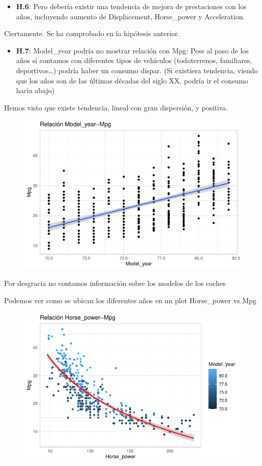 \begin{itemize}
\item \textbf{H.6}: Pero debería existir una tendencia de mejora de prestaciones con los años, incluyendo aumento de Displacement, Horse\_power y Acceleration.
\end{itemize}

Ciertamente. Se ha comprobado en la hipótesis anterior.

\begin{itemize}
\item \textbf{H.7}: Model\_year podría no mostrar relación con Mpg: Pese al paso de los años si contamos con diferentes tipos de vehículos (todoterrenos, familiares, deportivos\ldots) podría haber un consumo dispar. (Si existiera tendencia, viendo que los años son de las últimas décadas
  del siglo XX, podría ir el consumo hacia abajo)
\end{itemize}

Hemos visto que existe tendencia, lineal con gran dispersión, y
positiva.

\begin{figure}[H]\includegraphics[width=.9\linewidth]{img/EDA_files/figure-latex/unnamed-chunk-32-1} \caption{}\end{figure}

Por desgracia no contamos información sobre los modelos de los coches

Podemos ver como se ubican los diferentes años en un plot Horse\_power vs Mpg

\begin{figure}[H]\includegraphics[width=.9\linewidth]{img/EDA_files/figure-latex/unnamed-chunk-33-1} \caption{}\end{figure}

